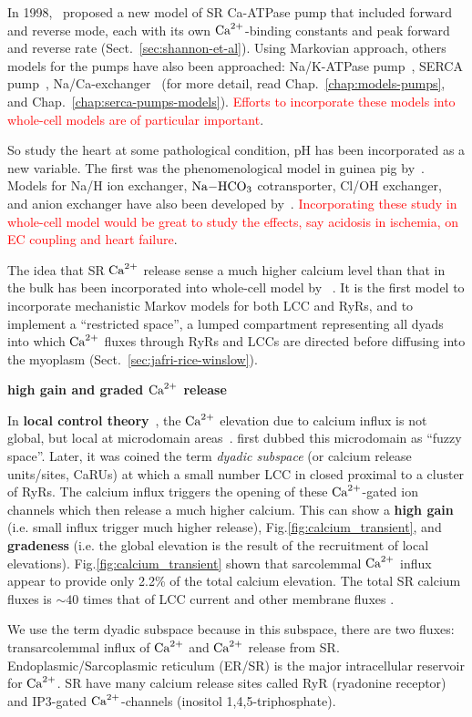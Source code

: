 In 1998,~\citep{shannon1998} proposed a new model of SR Ca-ATPase pump
that included forward and reverse mode, each with its own
${\text{Ca}^{2+}}$-binding constants and peak forward and reverse rate
(Sect.~\ref{sec:shannon-et-al}). Using Markovian approach, others
models for the pumps have also been approached: Na/K-ATPase
pump~\citep{smith2004}, SERCA pump~\citep{tran2009},
Na/Ca-exchanger~\citep{kang2004} (for more detail, read
Chap.~\ref{chap:models-pumps}, and Chap.~\ref{chap:serca-pumps-models}).
\textcolor{red}{Efforts to incorporate these models into whole-cell
  models are of particular important}.

So study the heart at some pathological condition, pH has been incorporated as a
new variable. The first was the phenomenological model in guinea pig
by~\citep{leem1999}. Models for Na/H ion exchanger, $\ce{Na-HCO3}$
cotransporter, Cl/OH exchanger, and anion exchanger have also been developed
by~\citep{crampin2006,crampin2006am}.
\textcolor{red}{Incorporating these study in whole-cell model would be
  great to study the effects, say acidosis in ischemia, on EC coupling and heart
  failure}.

The idea that SR ${\text{Ca}^{2+}}$ release sense a much higher calcium level than that in
the bulk has been incorporated into whole-cell model by ~\citep{jafri1998cad}.
It is the first model to incorporate mechanistic Markov models for both LCC and
RyRs, and to implement a ``restricted space'', a lumped compartment representing
all dyads into which ${\text{Ca}^{2+}}$ fluxes through RyRs and LCCs are directed before
diffusing into the myoplasm (Sect.~\ref{sec:jafri-rice-winslow}).

\begin{framed}
  {\bf high gain and graded ${\text{Ca}^{2+}}$ release}

  In {\bf local control theory}~\citep{wier1999}, the ${\text{Ca}^{2+}}$ elevation due to
  calcium influx is not global, but local at microdomain
  areas~\citep{lederer1990, stern1992tec, cheng1993cse}.
  \citep{lederer1990} first dubbed this microdomain as ``fuzzy space''. Later,
  it was coined the term {\it dyadic subspace} (or calcium release units/sites,
  CaRUs) at which a small number LCC in closed proximal to a cluster of RyRs. 
  The calcium influx triggers the opening of these ${\text{Ca}^{2+}}$-gated ion channels
  which then release a much higher calcium. This can show a {\bf high gain}
  (i.e. small influx trigger much higher release),
  Fig.\ref{fig:calcium_transient}, and {\bf gradeness} (i.e.
  the global elevation is the result of the recruitment of local elevations). 
  Fig.\ref{fig:calcium_transient} shown that sarcolemmal ${\text{Ca}^{2+}}$ influx appear to
  provide only 2.2\% of the total calcium elevation. The total SR calcium fluxes
  is $\sim 40$ times that of LCC current and other membrane fluxes
  \citep{cannell1994snu}.

  We use the term dyadic subspace because in this subspace, there are
  two fluxes: transarcolemmal influx of ${\text{Ca}^{2+}}$ and ${\text{Ca}^{2+}}$
  release from SR. Endoplasmic/Sarcoplasmic reticulum (ER/SR) is the major
  intracellular reservoir for ${\text{Ca}^{2+}}$. SR have many calcium release sites called
  RyR (ryadonine receptor) and IP3-gated ${\text{Ca}^{2+}}$-channels (inositol
  1,4,5-triphosphate). 
\end{framed}



